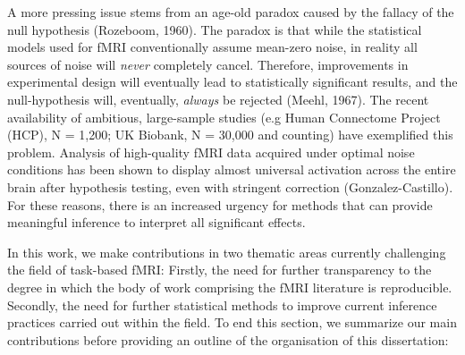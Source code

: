 A more pressing issue stems from an age-old paradox caused by the fallacy of the null hypothesis (Rozeboom, 1960). The paradox is that while the statistical models used for fMRI conventionally assume mean-zero noise, in reality all sources of noise will \textit{never} completely cancel. Therefore, improvements in experimental design will eventually lead to statistically significant results, and the null-hypothesis will, eventually, \textit{always} be rejected (Meehl, 1967). The recent availability of ambitious, large-sample studies (e.g Human Connectome Project (HCP), N = 1,200; UK Biobank, N = 30,000 and counting) have exemplified this problem. Analysis of high-quality fMRI data acquired under optimal noise conditions has been shown to display almost universal activation across the entire brain after hypothesis testing, even with stringent correction (Gonzalez-Castillo). For these reasons, there is an increased urgency for methods that can provide meaningful inference to interpret all significant effects. 

\bigskip

\noindent In this work, we make contributions in two thematic areas currently challenging the field of task-based fMRI: Firstly, the need for further transparency to the degree in which the body of work comprising the fMRI literature is reproducible. Secondly, the need for further statistical methods to improve current inference practices carried out within the field. To end this section, we summarize our main contributions before providing an outline of the organisation of this dissertation: 

